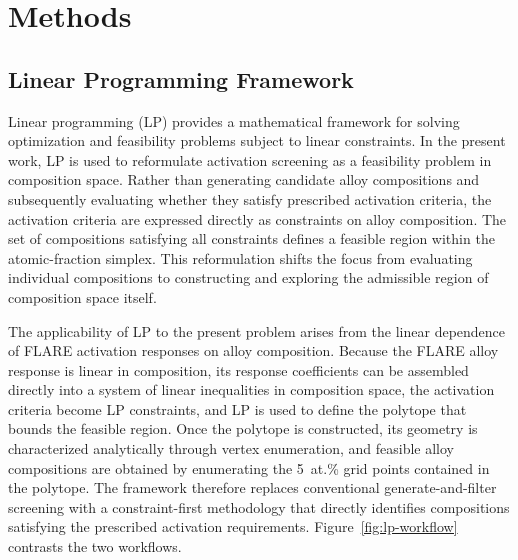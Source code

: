 \section{Methods}

\subsection{Linear Programming Framework}

Linear programming (LP) provides a mathematical framework for solving
optimization and feasibility problems subject to linear constraints. In the
present work, LP is used to reformulate activation screening as a feasibility
problem in composition space. Rather than generating candidate alloy
compositions and subsequently evaluating whether they satisfy prescribed
activation criteria, the activation criteria are expressed directly as
constraints on alloy composition. The set of compositions satisfying all
constraints defines a feasible region within the atomic-fraction simplex. This
reformulation shifts the focus from evaluating individual compositions to
constructing and exploring the admissible region of composition space itself.

The applicability of LP to the present problem arises from the linear dependence
of \textsc{FLARE} activation responses on alloy composition. Because the FLARE alloy
response is linear in composition, its response coefficients can be assembled
directly into a system of linear inequalities in composition space, the
activation criteria become LP constraints, and LP is used to define the polytope
that bounds the feasible region. Once the polytope is constructed, its geometry is
characterized analytically through vertex enumeration, and feasible alloy
compositions are obtained by enumerating the 5~at.\% grid points contained in the polytope. The
framework therefore replaces conventional generate-and-filter screening with a
constraint-first methodology that directly identifies compositions satisfying
the prescribed activation requirements. Figure~\ref{fig:lp-workflow} contrasts
the two workflows.


